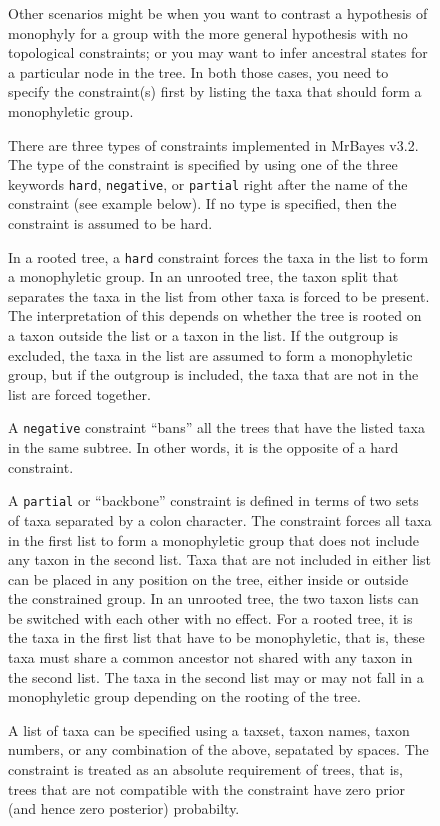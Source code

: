 \documentclass[12pt]{book}
\newcommand{\ttt}[1]{\texttt{#1}}
\begin{document}
\begin{figure}[h]
Other scenarios might be when you want to contrast a hypothesis of monophyly for a group with the
more general hypothesis with no topological constraints; or you may want to infer ancestral states
for a particular node in the tree. In both those cases, you need to specify the constraint(s) first
by listing the taxa that should form a monophyletic group.

There are three types of constraints implemented in MrBayes v3.2. The type of the constraint is
specified by using one of the three keywords \ttt{hard}, \ttt{negative}, or \ttt{partial} right
after the name of the constraint (see example below). If no type is specified, then the constraint
is assumed to be hard.

In a rooted tree, a \ttt{hard} constraint forces the taxa in the list to form a monophyletic group.
In an unrooted tree, the taxon split that separates the taxa in the list from other taxa is forced
to be present. The interpretation of this depends on whether the tree is rooted on a taxon outside
the list or a taxon in the list. If the outgroup is excluded, the taxa in the list are assumed to
form a monophyletic group, but if the outgroup is included, the taxa that are not in the list are
forced together.

A \ttt{negative} constraint ``bans'' all the trees that have the listed taxa in the same subtree.
In other words, it is the opposite of a hard constraint.

A \ttt{partial} or ``backbone'' constraint is defined in terms of two sets of taxa separated by a
colon character. The constraint forces all taxa in the first list to form a monophyletic group that
does not include any taxon in the second list. Taxa that are not included in either list can be
placed in any position on the tree, either inside or outside the constrained group. In an unrooted
tree, the two taxon lists can be switched with each other with no effect. For a rooted tree, it is
the taxa in the first list that have to be monophyletic, that is, these taxa must share a common
ancestor not shared with any taxon in the second list. The taxa in the second list may or may not
fall in a monophyletic group depending on the rooting of the tree.

A list of taxa can be specified using a taxset, taxon names, taxon numbers, or any combination of
the above, sepatated by spaces. The constraint is treated as an absolute requirement of trees, that
is, trees that are not compatible with the constraint have zero prior (and hence zero posterior)
probabilty.


\end{figure}
\end{document}

